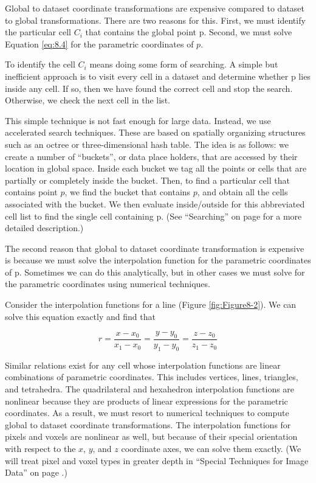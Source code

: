 Global to dataset coordinate transformations are expensive compared to dataset to global transformations. There are two reasons for this. First, we must identify the particular cell $C_i$ that contains the global point p. Second, we must solve Equation \ref{eq:8.4} for the parametric coordinates of $p$.

To identify the cell $C_i$ means doing some form of searching. A simple but inefficient approach is to visit every cell in a dataset and determine whether p lies inside any cell. If so, then we have found the correct cell and stop the search. Otherwise, we check the next cell in the list.

This simple technique is not fast enough for large data. Instead, we use accelerated search techniques. These are based on spatially organizing structures such as an octree or three-dimensional hash table. The idea is as follows: we create a number of ``buckets'', or data place holders, that are accessed by their location in global space. Inside each bucket we tag all the points or cells that are partially or completely inside the bucket. Then, to find a particular cell that contains point $p$, we find the bucket that contains $p$, and obtain all the cells associated with the bucket. We then evaluate inside/outside for this abbreviated cell list to find the single cell containing p. (See ``Searching'' on page \pageref{sec:searching} for a more detailed description.)

The second reason that global to dataset coordinate transformation is expensive is because we must solve the interpolation function for the parametric coordinates of p. Sometimes we can do this analytically, but in other cases we must solve for the parametric coordinates using numerical techniques.

Consider the interpolation functions for a line (Figure \ref{fig:Figure8-2}). We can solve this equation exactly and find that

\begin{equation}\label{eq:8.9}
r = \frac{x - x_0}{x_1 - x_0} = \frac{y - y_0}{y_1 - y_0} = \frac{z - z_0}{z_1 - z_0}
\end{equation}

Similar relations exist for any cell whose interpolation functions are linear combinations of parametric coordinates. This includes vertices, lines, triangles, and tetrahedra. The quadrilateral and hexahedron interpolation functions are nonlinear because they are products of linear expressions for the parametric coordinates. As a result, we must resort to numerical techniques to compute global to dataset coordinate transformations. The interpolation functions for pixels and voxels are nonlinear as well, but because of their special orientation with respect to the $x$, $y$, and $z$ coordinate axes, we can solve them exactly. (We will treat pixel and voxel types in greater depth in ``Special Techniques for Image Data'' on page \pageref{sec:special_techniques_for_image_data}.)

